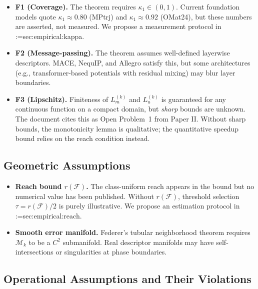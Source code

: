 \documentclass[11pt,a4paper]{article}
\makeatletter
\newcommand{\cref}[1]{\begingroup\def\crefsep{}\@for\crefitem:=#1\do{\crefsep\ref{\crefitem}\def\crefsep{, }}\endgroup}
\makeatother
\begin{document}
\begin{itemize}
    \item \textbf{F1 (Coverage).} The theorem requires $\kappa_1\in(0,1)$. Current foundation models quote $\kappa_1\approx 0.80$ (MPtrj) and $\kappa_1\approx 0.92$ (OMat24), but these numbers are asserted, not measured. We propose a measurement protocol in \cref{sec:empirical:kappa}.
    \item \textbf{F2 (Message-passing).} The theorem assumes well-defined layerwise descriptors. MACE, NequIP, and Allegro satisfy this, but some architectures (e.g., transformer-based potentials with residual mixing) may blur layer boundaries.
    \item \textbf{F3 (Lipschitz).} Finiteness of $L_m^{(k)}$ and $L_u^{(k)}$ is guaranteed for any continuous function on a compact domain, but \emph{sharp} bounds are unknown. The document cites this as Open Problem~1 from Paper II. Without sharp bounds, the monotonicity lemma is qualitative; the quantitative speedup bound relies on the reach condition instead.
\end{itemize}

\subsection{Geometric Assumptions}

\begin{itemize}
    \item \textbf{Reach bound $r(\mathcal{F})$.} The class-uniform reach appears in the bound but no numerical value has been published. Without $r(\mathcal{F})$, threshold selection $\tau=r(\mathcal{F})/2$ is purely illustrative. We propose an estimation protocol in \cref{sec:empirical:reach}.
    \item \textbf{Smooth error manifold.} Federer's tubular neighborhood theorem requires $\mathcal{M}_k$ to be a $C^2$ submanifold. Real descriptor manifolds may have self-intersections or singularities at phase boundaries.
\end{itemize}

\subsection{Operational Assumptions and Their Violations}
\end{document}

